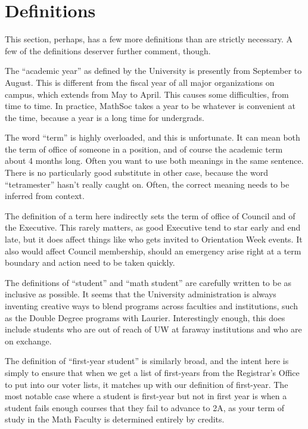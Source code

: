 \section{Definitions}

\begin{annotation}
This section, perhaps, has a few more definitions than are strictly necessary. A
few of the definitions deserver further comment, though.

The ``academic year'' as defined by the University is presently from September
to August. This is different from the fiscal year of all major organizations on
campus, which extends from May to April. This causes some difficulties, from
time to time. In practice, MathSoc takes a year to be whatever is convenient at
the time, because a year is a long time for undergrads.

The word ``term'' is highly overloaded, and this is unfortunate. It can mean
both the term of office of someone in a position, and of course the academic
term about 4 months long. Often you want to use both meanings in the same
sentence. There is no particularly good substitute in other case, because the
word ``tetramester'' hasn't really caught on. Often, the correct meaning needs
to be inferred from context.

The definition of a term here indirectly sets the term of office of Council and
of the Executive. This rarely matters, as good Executive tend to star early and
end late, but it does affect things like who gets invited to Orientation Week
events. It also would affect Council membership, should an emergency arise right
at a term boundary and action need to be taken quickly.

The definitions of ``student'' and ``math student'' are carefully written to be
as inclusive as possible. It seems that the University administration is always
inventing creative ways to blend programs across faculties and institutions,
such as the Double Degree programs with Laurier. Interestingly enough, this
does include students who are out of reach of UW at faraway institutions and who
are on exchange.

The definition of ``first-year student'' is similarly broad, and the intent here
is simply to ensure that when we get a list of first-years from the Registrar's
Office to put into our voter lists, it matches up with our definition of
first-year. The most notable case where a student is first-year but not in first
year is when a student fails enough courses that they fail to advance to 2A, as
your term of study in the Math Faculty is determined entirely by credits.


\end{annotation}
